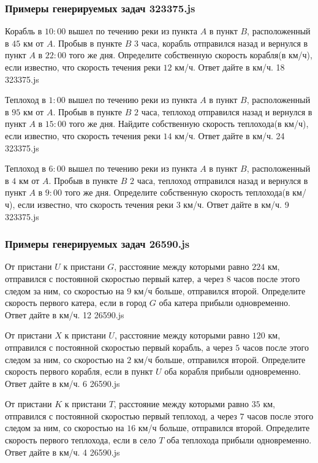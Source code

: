
\subsubsection*{Примеры генерируемых задач 323375.js}   

\par{Корабль в $10:00$ вышел по течению реки из пункта $A$ в пункт $B$, расположенный в $45$ км от $A$. Пробыв в пункте $B$ $3$ часа, корабль отправился назад и вернулся в пункт $A$ в $22:00$ того же дня. Определите собственную скорость корабля(в км/ч), если известно, что скорость течения реки $12$ км/ч. Ответ дайте в км/ч. }{ 18 }{323375.js}
\par{Теплоход в $1:00$ вышел по течению реки из пункта $A$ в пункт $B$, расположенный в $95$ км от $A$. Пробыв в пункте $B$ $2$ часа, теплоход отправился назад и вернулся в пункт $A$ в $15:00$ того же дня. Найдите собственную скорость теплохода(в км/ч), если известно, что скорость течения реки $14$ км/ч. Ответ дайте в км/ч. }{ 24 }{323375.js}
\par{Теплоход в $6:00$ вышел по течению реки из пункта $A$ в пункт $B$, расположенный в $4$ км от $A$. Пробыв в пункте $B$ $2$ часа, теплоход отправился назад и вернулся в пункт $A$ в $9:00$ того же дня. Определите собственную скорость теплохода(в км/ч), если известно, что скорость течения реки $3$ км/ч. Ответ дайте в км/ч. }{ 9 }{323375.js}	


\subsubsection*{Примеры генерируемых задач 26590.js}   

\par{От пристани $U$ к пристани $G$, расстояние между которыми равно $224$ км, отправился с постоянной скоростью первый катер, а через $8$ часов после этого следом за ним, со скоростью на $9$ км/ч больше, отправился второй. Определите скорость первого катера, если в город $G$ оба катера прибыли одновременно. Ответ дайте в км/ч. }{ 12 }{26590.js}
\par{От пристани $X$ к пристани $U$, расстояние между которыми равно $120$ км, отправился с постоянной скоростью первый корабль, а через $5$ часов после этого следом за ним, со скоростью на $2$ км/ч больше, отправился второй. Определите скорость первого корабля, если в пункт $U$ оба корабля прибыли одновременно. Ответ дайте в км/ч. }{ 6 }{26590.js}
\par{От пристани $K$ к пристани $T$, расстояние между которыми равно $35$ км, отправился с постоянной скоростью первый теплоход, а через $7$ часов после этого следом за ним, со скоростью на $16$ км/ч больше, отправился второй. Определите скорость первого теплохода, если в село $T$ оба теплохода прибыли одновременно. Ответ дайте в км/ч. }{ 4 }{26590.js}

